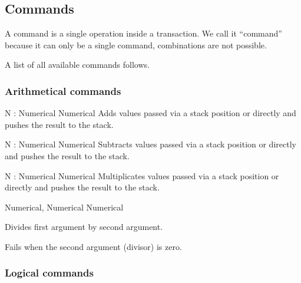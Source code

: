 \subsection{Commands}

A command is a single operation inside a transaction. We call it ``command''
because it can only be a single command, combinations are not possible.

A list of all available commands follows.

\subsubsection{Arithmetical commands}

    \begin{commands}

                {N : Numerical}
                {Numerical}
                {
                    Adds values passed via a stack position or directly and
                    pushes the result to the stack.
                }

                {N : Numerical}
                {Numerical}
                {
                    Subtracts values passed via a stack position or directly
                    and pushes the result to the stack.
                }

                {N : Numerical}
                {Numerical}
                {
                    Multiplicates values passed via a stack position or directly
                    and pushes the result to the stack.
                }

                {Numerical, Numerical}
                {Numerical}
                {
                    Divides first argument by second argument.

                    Fails when the second argument (divisor) is zero.
                }

    \end{commands}

\subsubsection{Logical commands}

